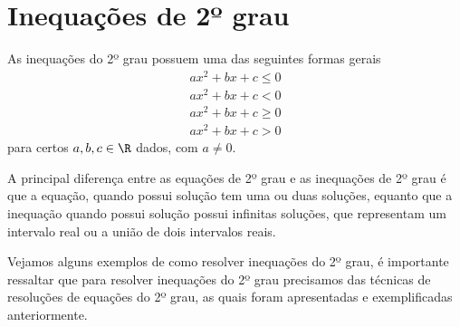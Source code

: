  \section{Inequações de 2º grau}
 
 \vskip0.3cm
 \colorbox{azul}{
 \begin{minipage}{0.9\linewidth}
 \begin{center}
  As inequações do 2º grau possuem uma das seguintes formas gerais
 \begin{eqnarray*}
 ax^2 + bx + c \leq 0 \\
 ax^2 + bx + c < 0 \\
 ax^2 + bx + c \geq 0 \\
 ax^2 + bx + c >0 
 \end{eqnarray*}  
 para certos $a, b, c \in \R$ dados, com $a \neq 0$.
 \end{center}
 \end{minipage}}
 \vskip0.3cm
  
 A principal diferença entre as equações de 2º grau e as inequações de 2º grau é que a equação, quando possui solução tem uma ou duas soluções, equanto que a inequação quando possui solução possui infinitas soluções, que representam um intervalo real ou a união de dois intervalos reais. 
 
 Vejamos alguns exemplos de como resolver inequações do 2º grau, é importante ressaltar que para resolver inequações do 2º grau precisamos das técnicas de resoluções de equações do 2º grau, as quais foram apresentadas e exemplificadas anteriormente.
 

